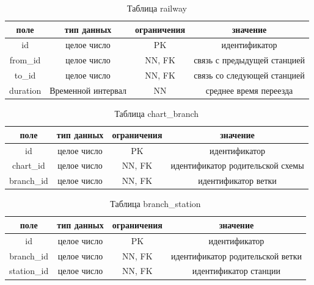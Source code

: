 \begin{table}[H]
    \begin{center}
        \caption{Таблица railway}
        \label{tbl:ordering}
        \begin{tabular}{|c|c|c|c|}
            \hline
            поле & тип данных & ограничения & значение \\
            \hline
            id & целое число & PK & идентификатор \\
            \hline
            from\_id & целое число & NN, FK & связь с предыдущей станцией \\
            \hline
            to\_id & целое число & NN, FK & связь со следующей станцией \\
            \hline
            duration & Временной интервал & NN & среднее время переезда \\
            \hline
        \end{tabular}
    \end{center}    
\end{table}

\begin{table}[H]
    \begin{center}
        \caption{Таблица chart\_branch}
        \label{tbl:chart_branch}
        \begin{tabular}{|c|c|c|c|}
            \hline
            поле & тип данных & ограничения & значение \\
            \hline
            id & целое число & PK & идентификатор \\
            \hline
            chart\_id & целое число & NN, FK & идентификатор родительской схемы \\
            \hline
            branch\_id & целое число & NN, FK & идентификатор ветки \\
            \hline
        \end{tabular}
    \end{center}    
\end{table}

\begin{table}[H]
    \begin{center}
        \caption{Таблица branch\_station}
        \label{tbl:branch_station}
        \begin{tabular}{|c|c|c|c|}
            \hline
            поле & тип данных & ограничения & значение \\
            \hline
            id & целое число & PK & идентификатор \\
            \hline
            branch\_id & целое число & NN, FK & идентификатор родительской ветки \\
            \hline
            station\_id & целое число & NN, FK & идентификатор станции \\
            \hline
        \end{tabular}
    \end{center}    
\end{table}

